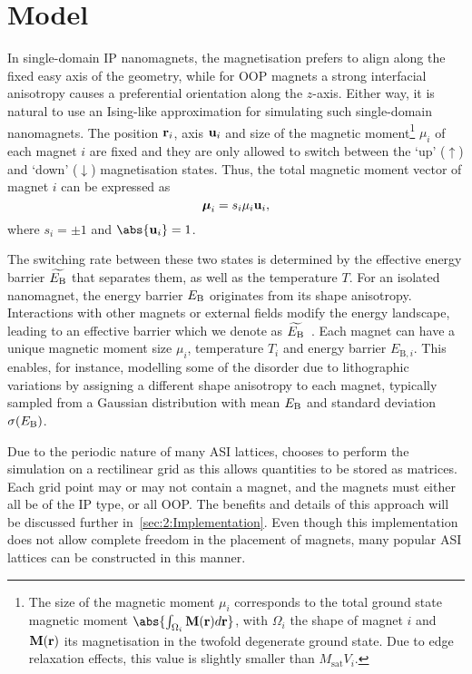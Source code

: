 \section{Model}
In single-domain IP nanomagnets, the magnetisation prefers to align along the fixed easy axis of the geometry, while for OOP magnets a strong interfacial anisotropy causes a preferential orientation along the $z$-axis.
Either way, it is natural to use an Ising-like approximation for simulating such single-domain nanomagnets.
The position $\boldsymbol{\mathbf{r}}_i$, axis $\boldsymbol{\mathbf{u}}_i$ and size of the magnetic moment\footnote{
	\label{fn:2:moment_integral}
	The size of the magnetic moment $\mu_i$ corresponds to the total ground state magnetic moment $\abs{\int_{\Omega_i} \vc{M}(\vc{r})d\vc{r}}$, with $\Omega_i$ the shape of magnet $i$ and $\boldsymbol{\mathbf{M}}(\boldsymbol{\mathbf{r}})$ its magnetisation in the twofold degenerate ground state. Due to edge relaxation effects, this value is slightly smaller than $M_\mathrm{sat} V_i$.
} $\mu_i$ of each magnet $i$ are fixed and they are only allowed to switch between the `up' ($\uparrow$) and `down' ($\downarrow$) magnetisation states.
Thus, the total magnetic moment vector of magnet $i$ can be expressed as
\begin{equation}
	\boldsymbol{\mathbf{\mu}}_i = s_i \mu_i \boldsymbol{\mathbf{u}}_i \mathrm{,}
\end{equation}
where $s_i = \pm 1$ and $\abs{\vc{u}_i} = 1$. \par
The switching rate between these two states is determined by the effective energy barrier $\widetilde{E_\mathrm{B}}$ that separates them, as well as the temperature $T$.
For an isolated nanomagnet, the energy barrier $E_\mathrm{B}$ originates from its shape anisotropy.
Interactions with other magnets or external fields modify the energy landscape, leading to an effective barrier which we denote as $\widetilde{E_\mathrm{B}}$~\cite{leo2021chiral}.
Each magnet can have a unique magnetic moment size $\mu_i$, temperature $T_i$ and energy barrier $E_{\mathrm{B},i}$.
This enables, for instance, modelling some of the disorder due to lithographic variations by assigning a different shape anisotropy to each magnet, typically sampled from a Gaussian distribution with mean $E_\mathrm{B}$ and standard deviation $\sigma(E_\mathrm{B})$. \\\par

Due to the periodic nature of many ASI lattices, \hotspice chooses to perform the simulation on a rectilinear grid as this allows quantities to be stored as matrices.
Each grid point may or may not contain a magnet, and the magnets must either all be of the IP type, or all OOP.
The benefits and details of this approach will be discussed further in~\cref{sec:2:Implementation}.
Even though this implementation does not allow complete freedom in the placement of magnets, many popular ASI lattices can be constructed in this manner. \par

